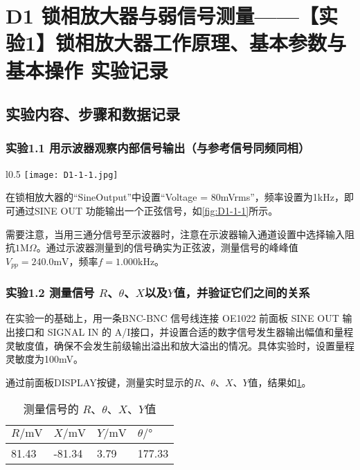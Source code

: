 \documentclass[dvipsnames, svgnames,a4paper,11pt]{article}
\begin{document}
\section{D1 \quad 锁相放大器与弱信号测量——【实验1】锁相放大器工作原理、基本参数与基本操作 \quad\heiti 实验记录}
\subsection{实验内容、步骤和数据记录}

	\subsubsection*{实验1.1 \quad 用示波器观察内部信号输出（与参考信号同频同相）}
	
	\begin{wrapfigure}{l}{0.5\textwidth}
		\centering
		\texttt{[image: D1-1-1.jpg]}
		\caption{用示波器观察内部信号输出}
		\label{fig:D1-1-1}
	\end{wrapfigure}

	在锁相放大器的“SineOutput”中设置“Voltage = 80mVrms”，频率设置为1kHz，即可通过SINE OUT 功能输出一个正弦信号，如\cref{fig:D1-1-1}所示。

	需要注意，当用三通分信号至示波器时，注意在示波器输入通道设置中选择输入阻抗$1\mathrm{M}\Omega$。通过示波器测量到的信号确实为正弦波，测量信号的峰峰值$V_{pp} = 240.0 \text{mV}$，频率$f = 1.000 \text{kHz}$。




	\clearpage
	\subsubsection*{实验1.2 \quad 测量信号 $R$、$\theta$、$X$以及$Y$值，并验证它们之间的关系}

	在实验一的基础上，用一条BNC-BNC 信号线连接 OE1022 前面板 SINE OUT 输出接口和 SIGNAL IN 的 A/I接口，并设置合适的数字信号发生器输出幅值和量程灵敏度值，确保不会发生前级输出溢出和放大溢出的情况。具体实验时，设置量程灵敏度为100mV。
	
	通过前面板DISPLAY按键，测量实时显示的$R$、$\theta$、$X$、$Y$值，结果如\cref{tbl:D1-2-1}。

	\begin{table}[htbp]
		\centering
		\begin{tabular}{|llll|} 
		\hline
		$R/\text{mV}$  & $X/\text{mV}$   & $Y/\text{mV}$ & $\theta/°$  \\ 
		\hline
		81.43 & -81.34 & 3.79 & 177.33   \\
		\hline
		\end{tabular}
		\caption{测量信号的 $R$、$\theta$、$X$、$Y$值}
		\label{tbl:D1-2-1}
	\end{table}
\end{document}
